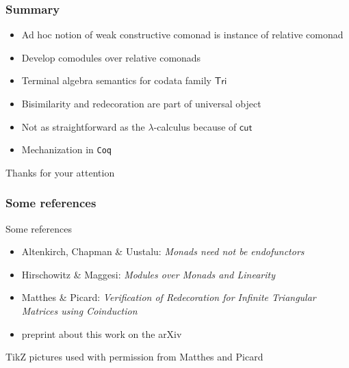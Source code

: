 \documentclass[
]
{beamer}
\newcommand{\constfont}[1]{\ensuremath{\mathsf{#1}}}
\newcommand{\Tri}{\constfont{Tri}}
\newcommand{\cut}{\constfont{cut}}
\begin{document}
\begin{frame}
 \frametitle{Summary}
  
   \begin{itemize}\setlength{\itemsep}{1em}
    \item Ad hoc notion of weak constructive comonad is instance of relative comonad
    \item Develop comodules over relative comonads
    \item Terminal algebra semantics for codata family $\Tri$
    \item Bisimilarity and redecoration are part of universal object
    \item Not as straightforward as the $\lambda$-calculus because of $\cut$
    \item Mechanization in \texttt{Coq}
   \end{itemize}

   \pause \begin{center} Thanks for your attention \end{center}
   
\end{frame}



\begin{frame}
 \frametitle{Some references}
 
  
  
  \begin{block}{Some references}
   \begin{itemize}
    \item Altenkirch, Chapman \& Uustalu: \emph{Monads need not be endofunctors}
    \item Hirschowitz \& Maggesi: \emph{Modules over Monads and Linearity}
    \item Matthes \& Picard: \emph{Verification of Redecoration for Infinite Triangular Matrices using Coinduction}
    \item preprint about this work on the arXiv
   \end{itemize}
  \end{block}

  TikZ pictures used with permission from Matthes and Picard
 
\end{frame}
\end{document}
